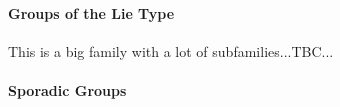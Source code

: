 



\paragraph{Groups of the Lie Type} This is a big family with a lot of subfamilies...TBC...


\paragraph{Sporadic Groups}











